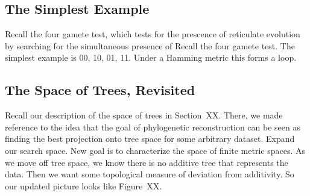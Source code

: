 \subsection{The Simplest Example}

Recall the four gamete test, which tests for the prescence of reticulate evolution by searching for the simultaneous presence of 
Recall the four gamete test.
The simplest example is 00, 10, 01, 11.
Under a Hamming metric this forms a loop.

\subsection{The Space of Trees, Revisited}

Recall our description of the space of trees in Section~XX.
There, we made reference to the idea that the goal of phylogenetic reconstruction can be seen as finding the best projection onto tree space for some arbitrary dataset.
Expand our search space.
New goal is to characterize the space of finite metric spaces.
As we move off tree space, we know there is no additive tree that represents the data.
Then we want some topological measure of deviation from additivity.
So our updated picture looks like Figure~XX.

